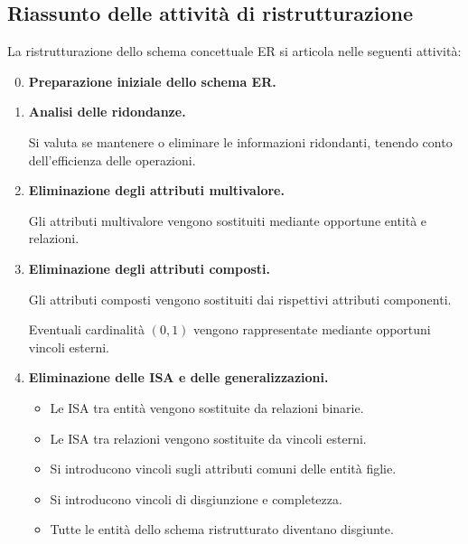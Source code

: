 \subsection{Riassunto delle attività di ristrutturazione}

La ristrutturazione dello schema concettuale
ER si articola nelle seguenti attività:

\begin{enumerate}
    \setcounter{enumi}{-1}

    \item \textbf{Preparazione iniziale dello
    schema ER.}

    \item \textbf{Analisi delle ridondanze.}

    Si valuta se mantenere o eliminare le
    informazioni ridondanti, tenendo conto
    dell'efficienza delle operazioni.

    \item \textbf{Eliminazione degli attributi
    multivalore.}

    Gli attributi multivalore vengono sostituiti
    mediante opportune entità e relazioni.

    \item \textbf{Eliminazione degli attributi
    composti.}

    Gli attributi composti vengono sostituiti
    dai rispettivi attributi componenti.

    Eventuali cardinalità $(0,1)$ vengono
    rappresentate mediante opportuni vincoli
    esterni.

    \item \textbf{Eliminazione delle ISA e
    delle generalizzazioni.}

    \begin{itemize}
        \item Le ISA tra entità vengono sostituite
        da relazioni binarie.

        \item Le ISA tra relazioni vengono
        sostituite da vincoli esterni.

        \item Si introducono vincoli sugli
        attributi comuni delle entità figlie.

        \item Si introducono vincoli di
        disgiunzione e completezza.

        \item Tutte le entità dello schema
        ristrutturato diventano disgiunte.
    \end{itemize}


\end{enumerate}
